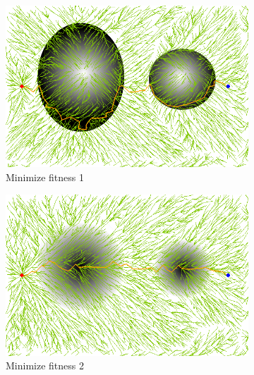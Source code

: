 \documentclass[conference]{IEEEtran}
\begin{document}
\begin{figure}
	\centering
	\begin{subfigure}[b]{0.45\linewidth}
		\centering
		\includegraphics[width=\textwidth]{fig/sim8-nconvex/MORRTstar03-0.png}
		\caption{Minimize fitness 1}
		\label{fig:sim:nonconvex:fitness1}
	\end{subfigure}
	\begin{subfigure}[b]{0.45\linewidth}
		\centering
		\includegraphics[width=\textwidth]{fig/sim8-nconvex/MORRTstar03-1.png}
		\caption{Minimize fitness 2}
		\label{fig:sim:nonconvex:fitness2}
	\end{subfigure}  \\
	\begin{subfigure}[b]{0.45\linewidth}
		\centering

\end{subfigure}
\end{figure}
\end{document}
